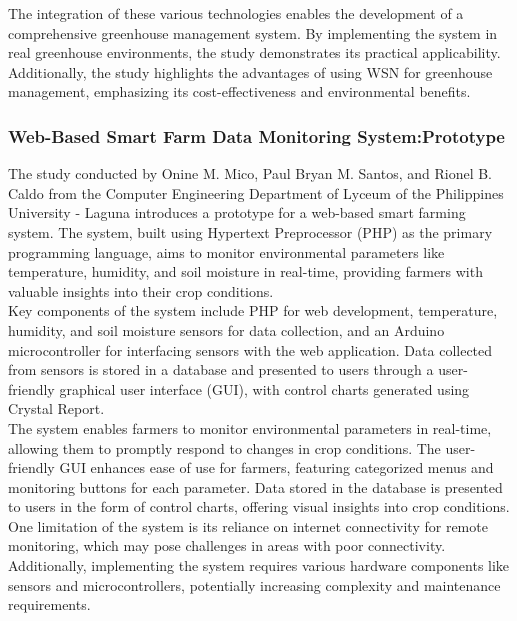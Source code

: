 \documentclass[12pt, a4paper]{article}
\begin{document}
The integration of these various technologies enables the development of a comprehensive greenhouse management system. By implementing the system in real greenhouse environments, the study demonstrates its practical applicability. Additionally, the study highlights the advantages of using WSN for greenhouse management, emphasizing its cost-effectiveness and environmental benefits.

\subsubsection{Web-Based Smart Farm Data Monitoring System:Prototype}
The study conducted by Onine M. Mico, Paul Bryan M. Santos, and Rionel B. Caldo \cite{mico2016web} from the Computer Engineering Department of Lyceum of the Philippines University - Laguna introduces a prototype for a web-based smart farming system. The system, built using Hypertext Preprocessor (PHP) as the primary programming language, aims to monitor environmental parameters like temperature, humidity, and soil moisture in real-time, providing farmers with valuable insights into their crop conditions.\\
Key components of the system include PHP for web development, temperature, humidity, and soil moisture sensors for data collection, and an Arduino microcontroller for interfacing sensors with the web application. Data collected from sensors is stored in a database and presented to users through a user-friendly graphical user interface (GUI), with control charts generated using Crystal Report.\\
The system enables farmers to monitor environmental parameters in real-time, allowing them to promptly respond to changes in crop conditions. The user-friendly GUI enhances ease of use for farmers, featuring categorized menus and monitoring buttons for each parameter. Data stored in the database is presented to users in the form of control charts, offering visual insights into crop conditions.\\
One limitation of the system is its reliance on internet connectivity for remote monitoring, which may pose challenges in areas with poor connectivity. Additionally, implementing the system requires various hardware components like sensors and microcontrollers, potentially increasing complexity and maintenance requirements.
\end{document}
